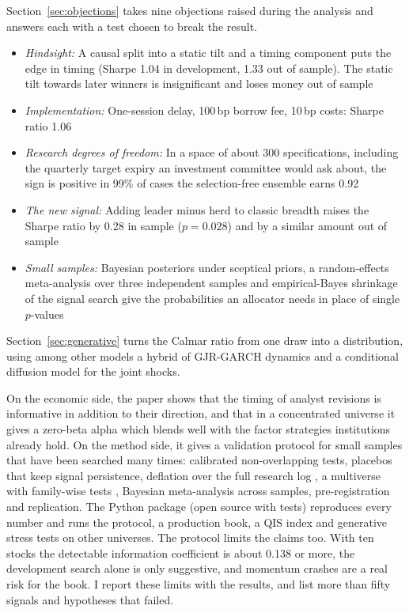  Section~\ref{sec:objections} takes nine objections raised during the analysis and answers each with a test chosen to break the result.
\begin{itemize}
  \item \emph{Hindsight:} A causal split into a static tilt and a timing component puts the edge in timing (Sharpe 1.04 in development, 1.33 out of sample). The static tilt towards later winners is insignificant and loses money out of sample
  \item \emph{Implementation:} One-session delay, 100\,bp borrow fee, 10\,bp costs: Sharpe ratio 1.06
  \item \emph{Research degrees of freedom:} In a space of about 300 specifications, including the quarterly target expiry an investment committee would ask about, the sign is positive in 99\% of cases the selection-free ensemble earns 0.92
  \item \emph{The new signal:} Adding leader minus herd to classic breadth raises the Sharpe ratio by 0.28 in sample ($p = 0.028$) and by a similar amount out of sample
  \item \emph{Small samples:} Bayesian posteriors under sceptical priors, a random-effects meta-analysis over three independent samples and empirical-Bayes shrinkage of the signal search give the probabilities an allocator needs in place of single $p$-values
\end{itemize}
Section~\ref{sec:generative} turns the Calmar ratio from one draw into a distribution, using among other models a hybrid of GJR-GARCH dynamics and a conditional diffusion model for the joint shocks.

On the economic side, the paper shows that the timing of analyst revisions is informative in addition to their direction, and that in a concentrated universe it gives a zero-beta alpha which blends well with the factor strategies institutions already hold. On the method side, it gives a validation protocol for small samples that have been searched many times: calibrated non-overlapping tests, placebos that keep signal persistence, deflation over the full research log \citep{bailey2014,bailey2017}, a multiverse with family-wise tests \citep{hansen2005,romano2005}, Bayesian meta-analysis across samples, pre-registration and replication. The Python package (open source with tests) reproduces every number and runs the protocol, a production book, a QIS index and generative stress tests on other universes. The protocol limits the claims too. With ten stocks the detectable information coefficient is about 0.138 or more, the development search alone is only suggestive, and momentum crashes are a real risk for the book. I report these limits with the results, and list more than fifty signals and hypotheses that failed.

